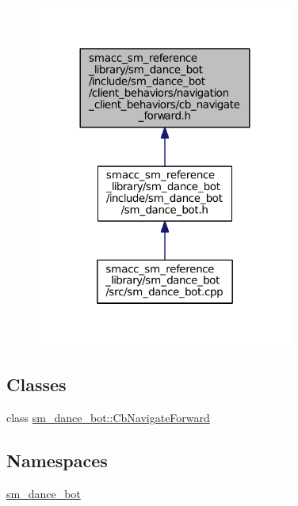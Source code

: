 \nopagebreak
\begin{figure}[H]
\begin{center}
\leavevmode
\includegraphics[width=240pt]{smacc__sm__reference__library_2sm__dance__bot_2include_2sm__dance__bot_2client__behaviors_2navig10843e1dd417ef4c42061b1c15726e21}
\end{center}
\end{figure}
\subsection*{Classes}
\begin{DoxyCompactItemize}
\item 
class \hyperlink{classsm__dance__bot_1_1CbNavigateForward}{sm\+\_\+dance\+\_\+bot\+::\+Cb\+Navigate\+Forward}
\end{DoxyCompactItemize}
\subsection*{Namespaces}
\begin{DoxyCompactItemize}
\item 
 \hyperlink{namespacesm__dance__bot}{sm\+\_\+dance\+\_\+bot}
\end{DoxyCompactItemize}
